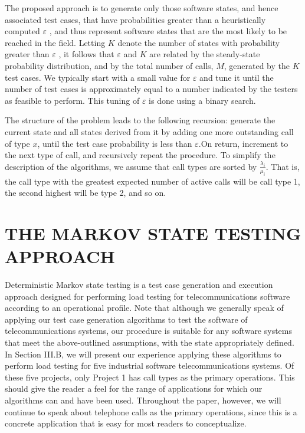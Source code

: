\documentclass[journal, twoside]{IEEEtran}
\begin{document}
The proposed approach is to generate only those software
states, and hence associated test cases, that have probabilities
greater than a heuristically computed $\varepsilon$ , and thus represent
software states that are the most likely to be reached in the
field. Letting $K$ denote the number of states with probability
greater than $\varepsilon$ , it follows that $\varepsilon$  and $K$ are related by the           
steady-state probability distribution, and by the total number of
calls, $M$, generated by the $K$ test cases. We typically start with
a small value for $\varepsilon$  and tune it until the number of test cases is
approximately equal to a number indicated by the testers as
feasible to perform. This tuning of  $\varepsilon$  is done using a binary search.

The structure of the problem leads to the following recursion: generate the current state and all states derived from it by
adding one more outstanding call of type $x$, until the test case
probability is less than $ \varepsilon $.On return, increment to the next type
of call, and recursively repeat the procedure.
To simplify the description of the algorithms, we assume
that call types are sorted by $\frac{\lambda_i}{\mu_i}$. That is, the call type with the
greatest expected number of active calls will be call type 1, the
second highest will be type 2, and so on. 

\section{THE MARKOV STATE TESTING APPROACH}
Deterministic Markov state testing is a test case generation
and execution approach designed for performing load testing
for telecommunications software according to an operational
profile. Note that although we generally speak of applying our
test case generation algorithms to test the software of telecommunications systems, our procedure is suitable for any
software systems that meet the above-outlined assumptions,
with the state appropriately defined. In Section III.B, we will
present our experience applying these algorithms to perform
load testing for five industrial software telecommunications
systems. Of these five projects, only Project 1 has call types as
the primary operations. This should give the reader a feel for
the range of applications for which our algorithms can and
have been used. Throughout the paper, however, we will continue to speak about telephone calls as the primary operations,
since this is a concrete application that is easy for most readers
to conceptualize.
\end{document}
